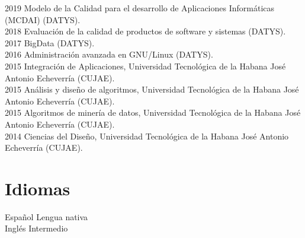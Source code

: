 \documentclass[letterpaper]{twentysecondcv} %
\begin{document}
\begin{twenty} %
\twentyitem
    	{2019}
		{}
        {Modelo de la Calidad para el desarrollo de Aplicaciones Informáticas (MCDAI) (DATYS).}
        {}
        {}
        {}
        \\
\twentyitem
    	{2018}
		{}
        {Evaluación de la calidad de productos de software y sistemas (DATYS).}
        {}
        {}
        {}
        \\
\twentyitem
    	{2017}
		{}
        {BigData (DATYS).}
        {}
        {}
        {}
        \\
\twentyitem
    	{2016}
		{}
        {Administración avanzada en GNU/Linux (DATYS).}
        {}
        {}
        {}
        \\
\twentyitem
    	{2015}
		{}
        {Integración de Aplicaciones, Universidad Tecnológica de la Habana José Antonio
Echeverría (CUJAE).}
        {}
        {}
        {}
        \\
\twentyitem
    	{2015}
		{}
        {Análisis y diseño de algoritmos, Universidad Tecnológica de la Habana José Antonio
Echeverría (CUJAE).}
        {}
        {}
        {}
        \\
\twentyitem
    	{2015}
		{}
        {Algoritmos de minería de datos, Universidad Tecnológica de la Habana José Antonio
Echeverría (CUJAE).}
        {}
        {}
        {}
        \\
\twentyitem
    	{2014}
		{}
        {Ciencias del Diseño, Universidad Tecnológica de la Habana José Antonio
Echeverría (CUJAE).}
        {}
        {}
        {}

\end{twenty}
\section{Idiomas}

\begin{twenty} %
\twentyitem
    	{Español}
		{}
        {Lengua nativa}
        {}
        {}
        {}
        \\
	\twentyitem
    	{Inglés}
		{}
        {Intermedio}
        {}
        {}
        {}


\end{twenty}
\end{document}
